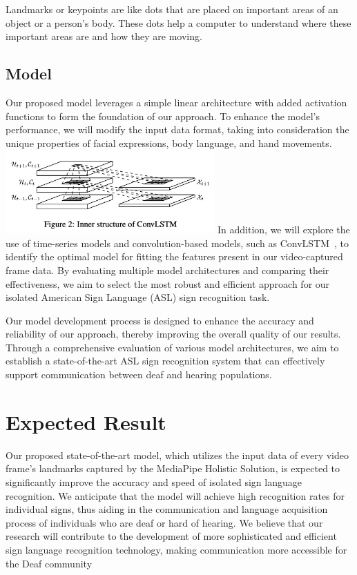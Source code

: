 \documentclass[10pt,twocolumn,letterpaper]{article}
\begin{document}
\begin{CJK*}{UTF8}{bsmi}
Landmarks or keypoints are like dots that are placed on important areas of an object or a person's body. 
These dots help a computer to understand where these important areas are and how they are moving.

\subsection{Model}

Our proposed model leverages a simple linear architecture with added activation functions to form 
the foundation of our approach. To enhance the model's performance, we will modify the input data format, 
taking into consideration the unique properties of facial expressions, body language, and hand movements.
\includegraphics[width=80mm]{ConvLSTM}
In addition, we will explore the use of time-series models and convolution-based models, 
such as ConvLSTM~\cite{NIPS2015_07563a3f}, to identify the optimal model for fitting the features present in our video-captured frame data. 
By evaluating multiple model architectures and comparing their effectiveness, 
we aim to select the most robust and efficient approach for our isolated American Sign Language (ASL) sign recognition task.

Our model development process is designed to enhance the accuracy and reliability of our approach, 
thereby improving the overall quality of our results. 
Through a comprehensive evaluation of various model architectures, we aim to establish a state-of-the-art ASL sign recognition system 
that can effectively support communication between deaf and hearing populations.

\section{Expected Result}
Our proposed state-of-the-art model, which utilizes the input data of every video frame's landmarks captured by the MediaPipe Holistic Solution, 
is expected to significantly improve the accuracy and speed of isolated sign language recognition. 
We anticipate that the model will achieve high recognition rates for individual signs, 
thus aiding in the communication and language acquisition process of individuals who are deaf or hard of hearing. 
We believe that our research will contribute to the development of more sophisticated and efficient sign language recognition technology, 
making communication more accessible for the Deaf community


{\small


}

\end{CJK*}
\end{document}
